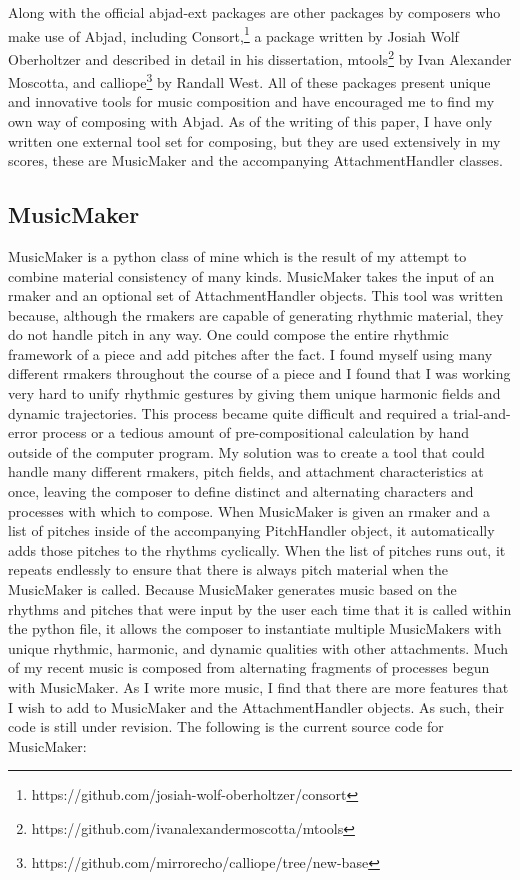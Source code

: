 Along with the official abjad-ext packages are other packages by composers who make use of Abjad, including Consort,\footnote{https://github.com/josiah-wolf-oberholtzer/consort} a package written by Josiah Wolf Oberholtzer and described in detail in his dissertation, mtools\footnote{https://github.com/ivanalexandermoscotta/mtools} by Ivan Alexander Moscotta, and calliope\footnote{https://github.com/mirrorecho/calliope/tree/new-base} by Randall West. All of these packages present unique and innovative tools for music composition and have encouraged me to find my own way of composing with Abjad. As of the writing of this paper, I have only written one external tool set for composing, but they are used extensively in my scores, these are MusicMaker and the accompanying AttachmentHandler classes.

\subsection{MusicMaker}

MusicMaker is a python class of mine which is the result of my attempt to combine material consistency of many kinds. MusicMaker takes the input of an rmaker and an optional set of AttachmentHandler objects. This tool was written because, although the rmakers are capable of generating rhythmic material, they do not handle pitch in any way. One could compose the entire rhythmic framework of a piece and add pitches after the fact. I found myself using many different rmakers throughout the course of a piece and I found that I was working very hard to unify rhythmic gestures by giving them unique harmonic fields and dynamic trajectories. This process became quite difficult and required a trial-and-error process or a tedious amount of pre-compositional calculation by hand outside of the computer program. My solution was to create a tool that could handle many different rmakers, pitch fields, and attachment characteristics at once, leaving the composer to define distinct and alternating characters and processes with which to compose. When MusicMaker is given an rmaker and a list of pitches inside of the accompanying PitchHandler object, it automatically adds those pitches to the rhythms cyclically. When the list of pitches runs out, it repeats endlessly to ensure that there is always pitch material when the MusicMaker is called. Because MusicMaker generates music based on the rhythms and pitches that were input by the user each time that it is called within the python file, it allows the composer to instantiate multiple MusicMakers with unique rhythmic, harmonic, and dynamic qualities with other attachments. Much of my recent music is composed from alternating fragments of processes begun with MusicMaker. As I write more music, I find that there are more features that I wish to add to MusicMaker and the AttachmentHandler objects. As such, their code is still under revision. The following is the current source code for MusicMaker:

